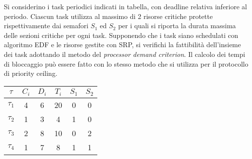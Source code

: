 \begin{Esercizio5}

Si considerino i task periodici indicati in tabella, con deadline relativa inferiore 
al periodo. Ciascun task utilizza al massimo di 2 risorse critiche protette 
rispettivamente dai semafori $S_1$ ed $S_2$ per i quali si riporta la durata massima 
delle sezioni critiche per ogni task. Supponendo che i task siano schedulati con 
algoritmo EDF e le risorse gestite con SRP, si verifichi la fattibilità dell'insieme 
dei task adottando il metodo del \textit{processor demand criterion}. Il calcolo dei 
tempi di bloccaggio può essere fatto con lo stesso metodo che si utilizza per il 
protocollo di priority ceiling.

\begin{table}[h]
\centering
\begin{tabular}{|c|c|c|c|c|c|}
\hline
$\tau$ & $C_i$ & $D_i$ & $T_i$ & $S_1$ & $S_2$ \\
\hline
$\tau_1$ & 4 & 6 & 20 & 0 & 0 \\
\hline
$\tau_2$ & 1 & 3 & 4 & 1 & 0 \\
\hline
$\tau_3$ & 2 & 8 & 10 & 0 & 2 \\
\hline
$\tau_4$ & 1 & 7 & 8 & 1 & 1 \\
\hline
\end{tabular}
\label{tab:task_edf_srp}
\end{table}

\end{Esercizio5}